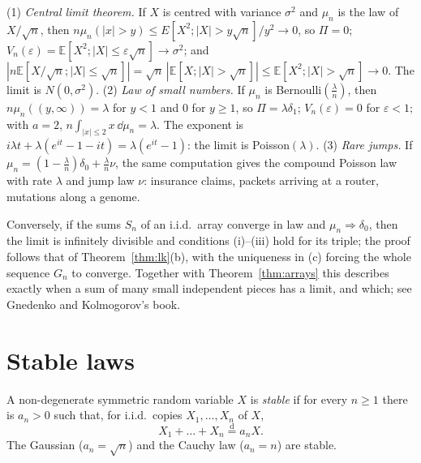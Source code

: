 \begin{example}\label{ex:threelimits}
(1) \emph{Central limit theorem.} If $X$ is centred with variance $\sigma^2$ and $\mu_n$ is the law of $X/\sqrt n$, then
$n\mu_n(|x|>y)\le E[X^2;|X|>y\sqrt n]/y^2\to0$, so $\Pi=0$; $V_n(\varepsilon)=\mathbb E[X^2;|X|\le\varepsilon\sqrt n]\to\sigma^2$; and
$|n\mathbb E[X/\sqrt n;|X|\le\sqrt n]|=\sqrt n\,|\mathbb E[X;|X|>\sqrt n]|\le\mathbb E[X^2;|X|>\sqrt n]\to0$. The limit is $N(0,\sigma^2)$.
(2) \emph{Law of small numbers.} If $\mu_n$ is Bernoulli$(\frac\lambda n)$, then $n\mu_n((y,\infty))=\lambda$ for $y<1$ and $0$ for $y\ge1$, so $\Pi=\lambda\delta_1$; $V_n(\varepsilon)=0$
for $\varepsilon<1$; with $a=2$, $n\int_{|x|\le2}x\,\dd\mu_n=\lambda$. The exponent is $i\lambda t+\lambda(e^{it}-1-it)=\lambda(e^{it}-1)$: the limit is Poisson$(\lambda)$.
(3) \emph{Rare jumps.} If $\mu_n=(1-\frac\lambda n)\delta_0+\frac\lambda n\nu$, the same computation gives the compound Poisson law with rate $\lambda$ and jump law $\nu$:
insurance claims, packets arriving at a router, mutations along a genome.
\end{example}

\begin{remark}
Conversely, if the sums $S_n$ of an i.i.d.\ array converge in law and $\mu_n\Rightarrow\delta_0$, then the limit is infinitely divisible and conditions (i)--(iii)
hold for its triple; the proof follows that of Theorem~\ref{thm:lk}(b), with the uniqueness in (c) forcing the whole sequence $G_n$ to converge. Together with
Theorem~\ref{thm:arrays} this describes exactly when a sum of many small independent pieces has a limit, and which; see Gnedenko and Kolmogorov's book.
\end{remark}

\section{Stable laws}

A non-degenerate symmetric random variable $X$ is \emph{stable} if for every $n\ge1$ there is $a_n>0$ such that, for i.i.d.\ copies $X_1,\dots,X_n$ of $X$,
\[
X_1+\dots+X_n\overset{\mathrm d}=a_nX.
\]
The Gaussian ($a_n=\sqrt n$) and the Cauchy law ($a_n=n$) are stable.

